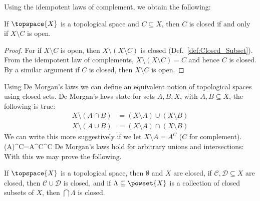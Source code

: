 \documentclass{book}                                                           %
\begin{document}
                Using the idempotent laws of complement, we obtain the
                following:
                \begin{theorem}
                    \label{thm:Closed_Iff_Comp_is_Open}%
                    If $\topspace{X}$ is a topological space and
                    $C\subseteq{X}$, then $C$ is closed if and only if
                    $X\setminus{C}$ is open.
                \end{theorem}
                \begin{proof}
                    For if $X\setminus{C}$ is open, then
                    $X\setminus(X\setminus{C})$ is closed
                    (Def.~\ref{def:Closed_Subset}). From the idempotent law of
                    complements, $X\setminus(X\setminus{C})=C$ and hence $C$ is
                    closed. By a similar argument if $C$ is closed, then
                    $X\setminus{C}$ is open.
                \end{proof}
                Using De Morgan's laws we can define an equivalent notion of
                topological spaces using closed sets. De Morgan's laws state for
                sets $A,B,X$, with $A,B\subseteq{X}$, the following is true:%
                \begin{subequations}
                    \begin{align}
                        X\setminus(A\cap{B})
                            &=(X\setminus{A})\cup(X\setminus{B})\\
                        X\setminus(A\cup{B})
                            &=(X\setminus{A})\cap(X\setminus{B})
                    \end{align}
                \end{subequations}
                We can write this more suggestively if we let
                $X\setminus{A}=A^{C}$ ($C$ for complement).
                \vspace{-5ex}
                            {(A)^{C}=A^{C}^{C}}
                De Morgan's laws hold for arbitrary unions and intersections:
                With this we may prove the following.
                \begin{theorem}
                    If $\topspace{X}$ is a topological space, then $\emptyset$
                    and $X$ are closed, if $\mathcal{C},\mathcal{D}\subseteq{X}$
                    are closed, then $\mathcal{C}\cup\mathcal{D}$ is closed, and
                    if $\Lambda\subseteq\powset{X}$ is a collection of closed
                    subsets of $X$, then $\bigcap\Lambda$ is closed.
                \end{theorem}
\end{document}

